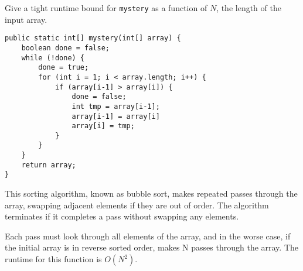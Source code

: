 \question Give a tight runtime bound for \texttt{mystery} as a function of $N$, the length of the input array.

\begin{lstlisting}
public static int[] mystery(int[] array) {
    boolean done = false;
    while (!done) {
        done = true;
        for (int i = 1; i < array.length; i++) {
            if (array[i-1] > array[i]) {
                done = false;
                int tmp = array[i-1];
                array[i-1] = array[i]
                array[i] = tmp;
            }
        }
    }
    return array;
}
\end{lstlisting}

\begin{solution}[0.5in]
This sorting algorithm, known as bubble sort, makes repeated passes through the array, swapping adjacent elements if they are out of order. The algorithm terminates if it completes a pass without swapping any elements. 

Each pass must look through all elements of the array, and in the worse case, if the initial array is in reverse sorted order, makes N passes through the array. The runtime for this function is $O(N^2)$.
\end{solution}